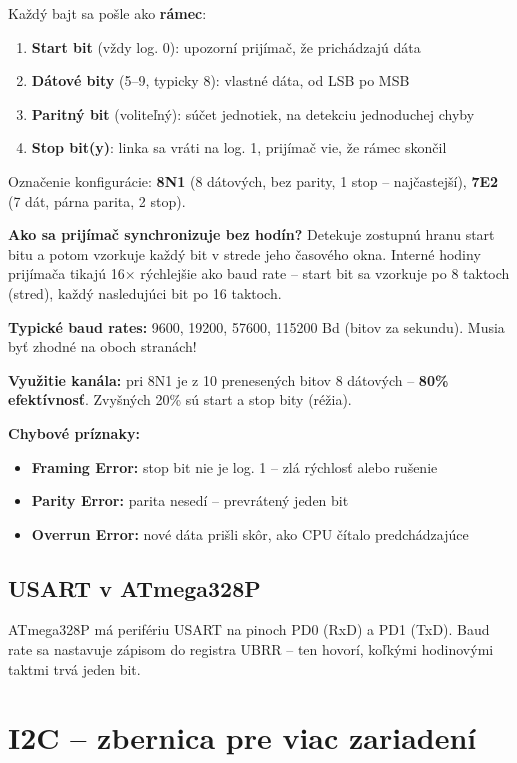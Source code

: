 Každý bajt sa pošle ako \textbf{rámec}:
\begin{enumerate}
    \item \textbf{Start bit} (vždy log. 0): upozorní prijímač, že prichádzajú dáta
    \item \textbf{Dátové bity} (5--9, typicky 8): vlastné dáta, od LSB po MSB
    \item \textbf{Paritný bit} (voliteľný): súčet jednotiek, na detekciu jednoduchej chyby
    \item \textbf{Stop bit(y)}: linka sa vráti na log. 1, prijímač vie, že rámec skončil
\end{enumerate}

Označenie konfigurácie: \textbf{8N1} (8 dátových, bez parity, 1 stop -- najčastejší), \textbf{7E2} (7 dát, párna parita, 2 stop).

\textbf{Ako sa prijímač synchronizuje bez hodín?} Detekuje zostupnú hranu start bitu a potom vzorkuje každý bit v strede jeho časového okna. Interné hodiny prijímača tikajú 16× rýchlejšie ako baud rate -- start bit sa vzorkuje po 8 taktoch (stred), každý nasledujúci bit po 16 taktoch.

\textbf{Typické baud rates:} 9600, 19200, 57600, 115200 Bd (bitov za sekundu). Musia byť zhodné na oboch stranách!

\textbf{Využitie kanála:} pri 8N1 je z 10 prenesených bitov 8 dátových -- \textbf{80\% efektívnosť}. Zvyšných 20\% sú start a stop bity (réžia).

\textbf{Chybové príznaky:}
\begin{itemize}
    \item \textbf{Framing Error:} stop bit nie je log. 1 -- zlá rýchlosť alebo rušenie
    \item \textbf{Parity Error:} parita nesedí -- prevrátený jeden bit
    \item \textbf{Overrun Error:} nové dáta prišli skôr, ako CPU čítalo predchádzajúce
\end{itemize}

\subsection{USART v ATmega328P}

ATmega328P má perifériu USART na pinoch PD0 (RxD) a PD1 (TxD). Baud rate sa nastavuje zápisom do registra UBRR -- ten hovorí, koľkými hodinovými taktmi trvá jeden bit.

\section{I2C -- zbernica pre viac zariadení}

